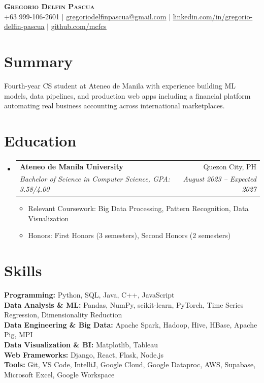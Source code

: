 \documentclass[letterpaper,11pt]{article}
\makeatletter
\newcommand{\resumeItem}[1]{
  \item\small{
    {#1 \vspace{-2pt}}
  }
}
\newcommand{\resumeSubheading}[4]{
  \vspace{-2pt}\item
    \begin{tabular*}{0.97\textwidth}[t]{l@{\extracolsep{\fill}}r}
      \textbf{\footnotesize #1} & \footnotesize #2 \\
      \textit{\footnotesize #3} & \textit{\footnotesize #4} \\
    \end{tabular*}\vspace{-7pt}
}
\newcommand{\resumeSubHeadingListStart}{\begin{itemize}[leftmargin=0.15in, label={}]}
\newcommand{\resumeSubHeadingListEnd}{\end{itemize}}
\newcommand{\resumeItemListStart}{\begin{itemize}}
\newcommand{\resumeItemListEnd}{\end{itemize}\vspace{-7pt}}
\makeatother
\begin{document}
\begin{center}
    \textbf{\Huge \scshape Gregorio Delfin Pascua} \\ \vspace{1pt}
    \small +63 999-106-2601 $|$ 
    \href{mailto:gregoriodelfinpascua@gmail.com}{\underline{gregoriodelfinpascua@gmail.com}} $|$ 
    \href{https://linkedin.com/in/gregorio-delfin-pascua}{\underline{linkedin.com/in/gregorio-delfin-pascua}} $|$
    \href{https://github.com/mcfcs}{\underline{github.com/mcfcs}}
\end{center}

\section{Summary}
 \begin{itemize}[leftmargin=0.15in, label={}]
    \small{\item{
     {Fourth-year CS student at Ateneo de Manila with experience building ML models, data pipelines, and production web apps including a financial platform automating real business accounting across international marketplaces.} \\
}}
 \end{itemize}

\section{Education}
  \resumeSubHeadingListStart
    \resumeSubheading
      {Ateneo de Manila University}{Quezon City, PH}
      {Bachelor of Science in Computer Science, GPA: 3.58/4.00}{August 2023 -- Expected 2027}
    \resumeItemListStart
      \resumeItem{Relevant Coursework: Big Data Processing, Pattern Recognition, Data Visualization}
      \resumeItem{Honors: First Honors (3 semesters), Second Honors (2 semesters)}
    \resumeItemListEnd
  \resumeSubHeadingListEnd

\section{Skills}
 \begin{itemize}[leftmargin=0.15in, label={}]
    \small{\item{
    \textbf{Programming:} Python, SQL, Java, C++, JavaScript \\
    \textbf{Data Analysis \& ML:} Pandas, NumPy, scikit-learn, PyTorch, Time Series Regression, Dimensionality Reduction \\
    \textbf{Data Engineering \& Big Data:} Apache Spark, Hadoop, Hive, HBase, Apache Pig, MPI \\
    \textbf{Data Visualization \& BI:} Matplotlib, Tableau \\
    \textbf{Web Frameworks:} Django, React, Flask, Node.js \\ 
    \textbf{Tools:} Git, VS Code, IntelliJ, Google Cloud, Google Dataproc, AWS, Supabase, Microsoft Excel, Google Workspace
    }}
 \end{itemize}
\end{document}
